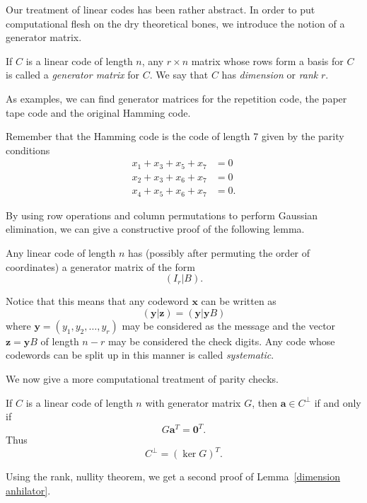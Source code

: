 Our treatment of linear codes has
been rather abstract. In order
to put computational flesh on
the  dry theoretical bones,
we introduce the notion of
a generator matrix.
\begin{definition} If $C$ is a linear
code of length $n$, any  $r\times n$
matrix whose rows form a basis
for $C$ is called a \emph{generator matrix}
for $C$. We say that $C$ has \emph{dimension}
or \emph{rank} $r$.
\end{definition}
\begin{example} As examples, we can find
generator matrices for the repetition code,
the paper tape code and the original Hamming code.
\end{example}
Remember that the Hamming code is the
code of length 7 given by the parity conditions
\begin{align*}
x_{1}+x_{3}+x_{5}+x_{7}&=0\\
x_{2}+x_{3}+x_{6}+x_{7}&=0\\
x_{4}+x_{5}+x_{6}+x_{7}&=0.
\end{align*}

By using row operations and column permutations
to perform Gaussian elimination, we
can give a constructive proof of
the following lemma.
\begin{lemma} Any linear code of length $n$ has
(possibly after permuting the order of coordinates)
a generator matrix of the form
\[(I_{r}|B).\]
\end{lemma}
Notice that this means that any codeword ${\mathbf x}$
can be written as
\[({\mathbf y}|{\mathbf z})=({\mathbf y}|{\mathbf y}B)\]
where ${\mathbf y}=(y_{1},y_{2},\dots,y_{r})$ may
be considered as the message and the vector
${\mathbf z}={\mathbf y}B$ of length $n-r$ may
be considered the check digits. Any code whose codewords
can be split up in this manner is called \emph{systematic}.

We now give a more computational treatment  of parity checks.
\begin{lemma}\label{kernel} If $C$ is a linear code
of length $n$
with generator matrix $G$, then ${\mathbf a}\in C^{\perp}$
if and only if
\[G{\mathbf a}^{T}={\boldsymbol  0}^{T}.\]
Thus
\[C^{\perp}=(\ker G)^{T}.\]
\end{lemma}
\noindent
Using the rank, nullity theorem,
we get a second proof of Lemma~\ref{dimension anhilator}.

